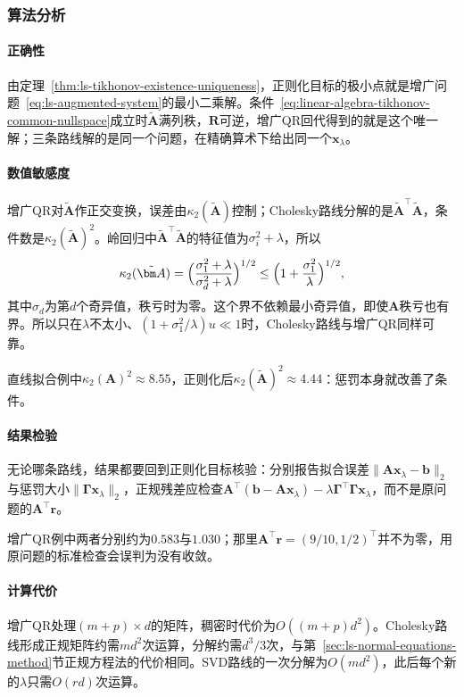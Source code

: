 \subsubsection{算法分析}

\paragraph{正确性}
由定理~\ref{thm:ls-tikhonov-existence-uniqueness}，正则化目标的极小点就是增广问题~\eqref{eq:ls-augmented-system}的最小二乘解。条件~\eqref{eq:linear-algebra-tikhonov-common-nullspace}成立时$\tilde{\bm A}$满列秩，$\bm R$可逆，增广QR回代得到的就是这个唯一解；三条路线解的是同一个问题，在精确算术下给出同一个$\bm x_\lambda$。

\paragraph{数值敏感度}
增广QR对$\tilde{\bm A}$作正交变换，误差由$\kappa_2(\tilde{\bm A})$控制；Cholesky路线分解的是$\tilde{\bm A}^\top\tilde{\bm A}$，条件数是$\kappa_2(\tilde{\bm A})^2$。岭回归中$\tilde{\bm A}^\top\tilde{\bm A}$的特征值为$\sigma_i^2+\lambda$，所以
\begin{equation}
 \kappa_2(\tilde{\bm A})=\Bigl(\frac{\sigma_1^2+\lambda}{\sigma_d^2+\lambda}\Bigr)^{1/2}\leq\Bigl(1+\frac{\sigma_1^2}{\lambda}\Bigr)^{1/2},
 \label{eq:ls-ridge-augmented-condition}
\end{equation}
其中$\sigma_d$为第$d$个奇异值，秩亏时为零。这个界不依赖最小奇异值，即使$\bm A$秩亏也有界。所以只在$\lambda$不太小、$(1+\sigma_1^2/\lambda)u\ll1$时，Cholesky路线与增广QR同样可靠。

直线拟合例中$\kappa_2(\bm A)^2\approx8.55$，正则化后$\kappa_2(\tilde{\bm A})^2\approx4.44$：惩罚本身就改善了条件。

\paragraph{结果检验}
无论哪条路线，结果都要回到正则化目标核验：分别报告拟合误差$\lVert\bm A\bm x_\lambda-\bm b\rVert_2$与惩罚大小$\lVert\bm\Gamma\bm x_\lambda\rVert_2$，正规残差应检查$\bm A^\top(\bm b-\bm A\bm x_\lambda)-\lambda\bm\Gamma^\top\bm\Gamma\bm x_\lambda$，而不是原问题的$\bm A^\top\bm r$。

增广QR例中两者分别约为$0.583$与$1.030$；那里$\bm A^\top\bm r=(9/10,1/2)^\top$并不为零，用原问题的标准检查会误判为没有收敛。

\paragraph{计算代价}
增广QR处理$(m+p)\times d$的矩阵，稠密时代价为$O((m+p)d^2)$。Cholesky路线形成正规矩阵约需$md^2$次运算，分解约需$d^3/3$次，与第~\ref{sec:ls-normal-equations-method}节正规方程法的代价相同。SVD路线的一次分解为$O(md^2)$，此后每个新的$\lambda$只需$O(rd)$次运算。


